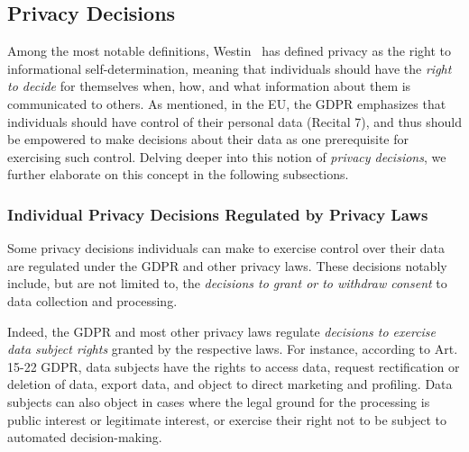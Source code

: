 


\subsection{Privacy Decisions}
\label{subsec:privacy_decisions}
Among the most notable definitions, Westin~\cite{westin_privacy_1968} has defined privacy as the right to informational self-determination, meaning that individuals should have the \textit{right to decide} for themselves when, how, and what information about them is communicated to others.
As mentioned, in the EU, the GDPR emphasizes that individuals should have control of their personal data (Recital 7), and thus should be empowered to make decisions about their data as one prerequisite for exercising such control.
Delving deeper into this notion of \textit{privacy decisions}, we further elaborate on this concept in the following subsections.

\subsubsection{Individual Privacy Decisions Regulated by Privacy Laws}
Some privacy decisions individuals can make to exercise control over their data are regulated under the GDPR and other privacy laws. 
These decisions notably include, but are not limited to, the \textit{decisions to grant or to withdraw consent} to data collection and processing.

Indeed, the GDPR and most other privacy laws regulate \textit{decisions to exercise data subject rights} granted by the respective laws. 
For instance, according to Art. 15-22 GDPR, data subjects have the rights to access data, request rectification or deletion of data, export data, and object to direct marketing and profiling.
Data subjects can also object in cases where the legal ground for the processing is public interest or legitimate interest, or exercise their right not to be subject to automated decision-making.


